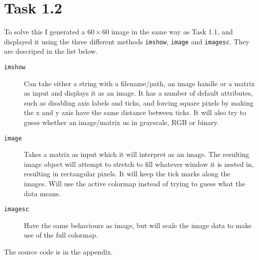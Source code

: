 \section{Task 1.2}
To solve this I generated a $60\times 60$ image in the same way as Task 1.1, and
displayed it using the three different methods \texttt{imshow}, \texttt{image}
and \texttt{imagesc}. They are descriped in the list below.


\begin{description}
\item[\texttt{imshow}] Can take either a string with a filename/path, an image
  handle or a matrix as input and displays it as an image. It has a number of
  default attributes, such as disabling axis labels and ticks, and forcing
  square pixels by making the x and y axis have the same distance between ticks.
  It will also try to guess whether an image/matrix us in grayscale, RGB or
  binary.
\item[\texttt{image}] Takes a matrix as input which it will interpret as an
  image. The resulting image object will attempt to stretch to fill whatever
  window it is nested in, resulting in rectangular pixels. It will keep the tick
  marks along the images. Will use the active colormap instead of trying to
  guess what the data means.

\item[\texttt{imagesc}] Have the same behaviours as image, but will scale the
  image data to make use of the full colormap.
\end{description}

The source code is in the appendix.
